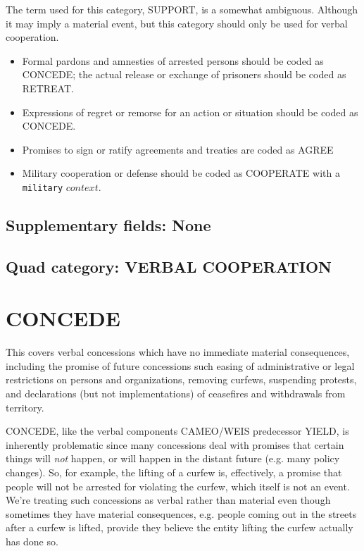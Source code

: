 \documentclass[11pt]{report}
\newcommand{\plcat}[1]{\textsf{#1}}
\newcommand{\ti}[1]{\textit{#1}}
\newcommand{\txt}[1]{\texttt{#1}}
\begin{document}
The term used for this category, \plcat{SUPPORT}, is a somewhat ambiguous. Although it may imply a material event, but this category should only be used for verbal cooperation.

\begin{itemize}
\item Formal pardons and amnesties of arrested persons should be coded as \plcat{CONCEDE}; the actual release  or exchange of prisoners should be coded as \plcat{RETREAT}.

\item Expressions of regret or remorse for an action or situation should be coded as \plcat{CONCEDE}.

\item Promises to sign or ratify agreements and treaties are coded as \plcat{AGREE}

\item Military cooperation or defense should be coded as \plcat{COOPERATE} with a \txt{military} $context.$
\end{itemize}

\subsection{Supplementary fields: None}


\subsection{Quad category: VERBAL COOPERATION}


\newpage

\section{CONCEDE}

This covers verbal concessions which have no immediate material consequences, including the promise of future concessions such easing of administrative or legal restrictions on persons and organizations, removing curfews, suspending protests, and declarations (but not implementations) of ceasefires and withdrawals from territory.

\plcat{CONCEDE}, like the verbal components CAMEO/WEIS predecessor \plcat{YIELD}, is inherently problematic since many concessions deal with promises that certain things will \ti{not} happen, or will happen in the distant future (e.g. many policy changes). So, for example, the lifting of a curfew is, effectively, a promise that people will not be arrested for violating the curfew, which itself is not an event. We're treating such concessions as verbal rather than material even though sometimes they have material consequences, e.g. people coming out in the streets after a curfew is lifted, provide they believe the entity lifting the curfew actually has done so.  
\end{document}
